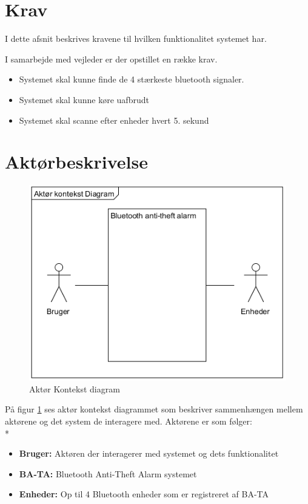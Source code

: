 \graphicspath{{Chapters/Krav/}}


\section{Krav}
I dette afsnit beskrives kravene til hvilken funktionalitet systemet har. 


I samarbejde med vejleder er der opstillet en række krav.
\begin{itemize}
\item Systemet skal kunne finde de 4 stærkeste bluetooth signaler. 
\item Systemet skal kunne køre uafbrudt
\item Systemet skal scanne efter enheder hvert 5. sekund 
\end{itemize}

\section{Aktørbeskrivelse}

\begin{figure}[H]
	\centering
	\includegraphics[width = 200 pt]{Img/Aktoer_Kontekst.png}
	\caption{Aktør Kontekst diagram}
	\label{fig:Aktoer Kontekst diagram}
\end{figure}

På figur \ref{fig:Aktoer Kontekst diagram} ses aktør kontekst diagrammet som beskriver sammenhængen mellem aktørene og det system de interagere med. Aktørene er som følger: \\*
\begin{itemize}
\item \textbf{Bruger:} Aktøren der interagerer med systemet og dets funktionalitet \\
\item \textbf{BA-TA:} Bluetooth Anti-Theft Alarm systemet\\
\item \textbf{Enheder:} Op til 4 Bluetooth enheder som er registreret af BA-TA \\
\end{itemize}

